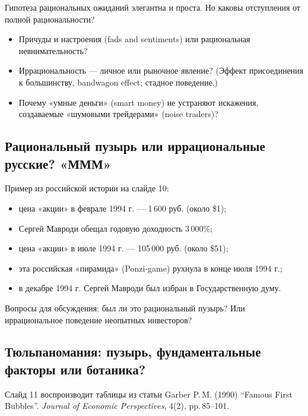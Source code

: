 \documentclass[10pt,a4paper]{article}
\begin{document}
Гипотеза рациональных ожиданий элегантна и проста. Но каковы отступления от полной рациональности?
\begin{itemize}[leftmargin=1.3em]
\item Причуды и настроения (fads and sentiments) или рациональная невнимательность?
\item Иррациональность — личное или рыночное явление? (Эффект присоединения к большинству, bandwagon effect; стадное поведение.)
\item Почему «умные деньги» (smart money) не устраняют искажения, создаваемые «шумовыми трейдерами» (noise traders)?
\end{itemize}

\subsection{Рациональный пузырь или иррациональные русские? «МММ»}

Пример из российской истории на слайде 10:
\begin{itemize}[leftmargin=1.3em]
\item цена «акции» в феврале 1994 г. --- 1\,600 руб. (около \$1);
\item Сергей Мавроди обещал годовую доходность 3\,000\%;
\item цена «акции» в июле 1994 г. --- 105\,000 руб. (около \$51);
\item эта российская «пирамида» (Ponzi-game) рухнула в конце июля 1994 г.;
\item в декабре 1994 г. Сергей Мавроди был избран в Государственную думу.
\end{itemize}
Вопросы для обсуждения: был ли это рациональный пузырь? Или иррациональное поведение неопытных инвесторов?

\subsection{Тюльпаномания: пузырь, фундаментальные факторы или ботаника?}

Слайд 11 воспроизводит таблицы из статьи Garber P.\,M. (1990) ``Famous First Bubbles''. \textit{Journal of Economic Perspectives}, 4(2), pp.\,85--101.
\end{document}
